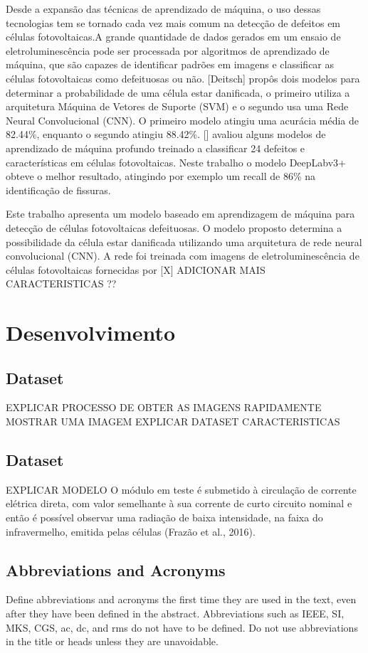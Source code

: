 \documentclass[conference]{IEEEtran}
\begin{document}
Desde a expansão das técnicas de aprendizado de máquina, o uso dessas
tecnologias tem se tornado cada vez mais comum na detecção de defeitos em
células fotovoltaicas.A grande quantidade de dados gerados em um ensaio de
eletroluminescência pode ser processada por algoritmos de aprendizado de
máquina, que são capazes de identificar padrões em imagens e classificar as
células fotovoltaicas como defeituosas ou não. [Deitsch] propôs dois modelos
para determinar a probabilidade de uma célula estar danificada, o primeiro
utiliza a arquitetura
Máquina de Vetores de Suporte (SVM) e o segundo usa uma Rede Neural
Convolucional (CNN). O primeiro modelo atingiu uma acurácia média de 82.44\%,
enquanto o segundo atingiu 88.42\%. [] avaliou alguns modelos de aprendizado
de máquina profundo treinado a classificar 24 defeitos e características em
células fotovoltaicas. Neste trabalho o modelo
DeepLabv3+ obteve o melhor resultado, atingindo por exemplo um recall de 86\%
na identificação de fissuras.

Este trabalho apresenta um modelo baseado em aprendizagem de máquina para
detecção de células fotovoltaicas defeituosas. O modelo proposto determina a
possibilidade
da célula estar danificada utilizando uma arquitetura de rede neural
convolucional (CNN). A rede foi treinada com imagens de eletroluminescência de
células fotovoltaicas fornecidas por [X]
ADICIONAR MAIS CARACTERISTICAS ??

\section{Desenvolvimento}
\subsection{Dataset}\label{AA}

EXPLICAR PROCESSO DE OBTER AS IMAGENS RAPIDAMENTE
MOSTRAR UMA IMAGEM
EXPLICAR DATASET CARACTERISTICAS

\subsection{Dataset}\label{AA}

EXPLICAR MODELO
O módulo em teste é submetido à
circulação de corrente elétrica direta, com valor semelhante à sua corrente de
curto circuito nominal e então é possível observar uma radiação de baixa
intensidade, na faixa do infravermelho, emitida pelas células (Frazão et al.,
2016).

\subsection{Abbreviations and Acronyms}\label{AA}
Define abbreviations and acronyms the first time they are used in the text,
even after they have been defined in the abstract. Abbreviations such as
IEEE, SI, MKS, CGS, ac, dc, and rms do not have to be defined. Do not use
abbreviations in the title or heads unless they are unavoidable.
\end{document}

